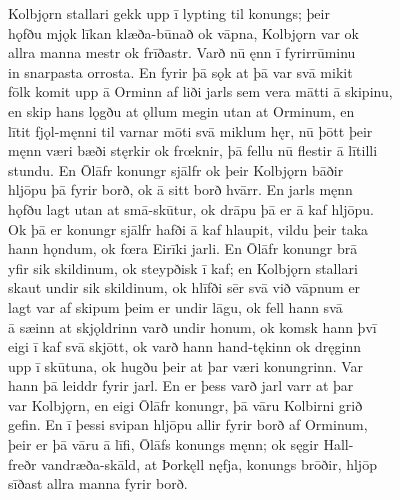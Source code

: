 \documentclass[12pt,letterpaper]{book}
\begin{document}
\begin{linenumbers}
Kolbjǫrn stallari gekk upp ī lypting til konungs; þeir\\
hǫfðu mjǫk līkan klæða-būnað ok vāpna, Kolbjǫrn var ok\\
allra manna mestr ok frīðastr.  Varð nū ęnn ī fyrirrūminu\\
in snarpasta orrosta.  En fyrir þā sǫk at þā var svā mikit\\
fōlk komit upp ā Orminn af liði jarls sem vera mātti ā skipinu,\\
en skip hans lǫgðu at ǫllum megin utan at Orminum, en\\
lītit fjǫl-męnni til varnar mōti svā miklum hęr, nū þōtt þeir\\
męnn væri bæði stęrkir ok frœknir, þā fellu nū flestir ā lītilli\\
stundu.  En Ōlāfr konungr sjālfr ok þeir Kolbjǫrn bāðir\\
hljōpu þā fyrir borð, ok ā sitt borð hvārr.  En jarls męnn\\
hǫfðu lagt utan at smā-skūtur, ok drāpu þā er ā kaf hljōpu.\\
Ok þā er konungr sjālfr hafði ā kaf hlaupit, vildu þeir taka\\
hann hǫndum, ok fœra Eirīki jarli.  En Ōlāfr konungr brā\\
yfir sik skildinum, ok steypðisk ī kaf; en Kolbjǫrn stallari\\
skaut undir sik skildinum, ok hlīfði sēr svā við vāpnum er\\
lagt var af skipum þeim er undir lāgu, ok fell hann svā\\
ā sæinn at skjǫldrinn varð undir honum, ok komsk hann þvī\\
eigi ī kaf svā skjōtt, ok varð hann hand-tękinn ok dręginn\\
upp ī skūtuna, ok hugðu þeir at þar væri konungrinn.  Var\\
hann þā leiddr fyrir jarl.  En er þess varð jarl varr at þar\\
var Kolbjǫrn, en eigi Ōlāfr konungr, þā vāru Kolbirni grið\\
gefin.  En ī þessi svipan hljōpu allir fyrir borð af Orminum,\\
þeir er þā vāru ā līfi, Ōlāfs konungs męnn; ok sęgir Hall-\\
freðr vandræða-skāld, at Þorkęll nęfja, konungs brōðir, hljōp\\
sīðast allra manna fyrir borð.


\end{linenumbers}
\end{document}
